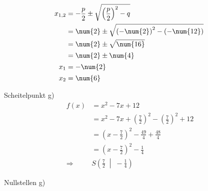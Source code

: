 \begin{exercise}
\begin{minipage}[t]{0.49\linewidth}
\begin{alignat*}{3}
          \nomod
          \\
          \noeq
          &
          x_{1,2}&=-\frac{p}{2}\pm\sqrt{\left(\frac{p}{2}\right)^2-q}
          &
          \nomod
          \\
          \noeq
          &
          &=\num{2}\pm\sqrt{\left(-\num{2}\right)^2-\left(-\num{12}\right)}
          &
          \nomod
          \\
          \noeq
          &
          &=\num{2}\pm\sqrt{\num{16}}
          &
          \nomod
          \\
          \noeq
          &
          &=\num{2}\pm\num{4}
          &
          \nomod
          \\
          \noeq
          &
          x_1&=-\num{2}
          &
          \nomod
          \\
          \noeq
          &
          x_2&=\num{6}
          &
          \nomod
        \end{alignat*}
      \endgroup
    \end{minipage}\bigskip\par
    \begin{minipage}[t]{0.49\linewidth}
      Scheitelpunkt g)
      \small
      \begin{equation*}
        \begin{split}
          f(x)&=x^2-7x+12
          \\
          &=x^2-7x+\left(\frac{7}{2}\right)^2-\left(\frac{7}{2}\right)^2+12
          \\
          &=\left(x-\frac{7}{2}\right)^2-\frac{49}{4}+\frac{48}{4}
          \\
          &=\left(x-\frac{7}{2}\right)^2-\frac{1}{4}
          \\[1ex]
          \Rightarrow\quad&S\left(\frac{7}{2}\;\middle|\;-\frac{1}{4}\right)
        \end{split}
      \end{equation*}
    \end{minipage}%
    \hfill
    \begin{minipage}[t]{0.49\linewidth}
      Nullstellen g)
      \small
      \begingroup
        \newcommand{\vstrut}{\vphantom{\left(f_0^0\right)}}%
        \newcommand{\noeq}{\phantom{\Leftrightarrow}\vstrut&\quad}%
        \newcommand{\iseq}{\Leftrightarrow\vstrut&\quad}%
        \newcommand{\impl}{\Rightarrow\vstrut&\quad}%
        \newcommand{\nomod}{\quad&\phantom{|}}%
        \newcommand{\domod}[1]{\quad&|#1}%

\end{minipage}
\end{exercise}
